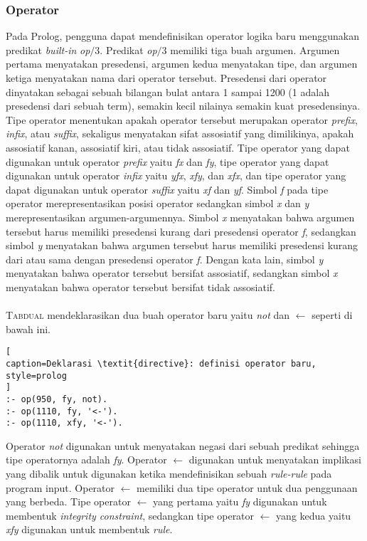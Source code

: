 \subsubsection{Operator}

Pada Prolog, pengguna dapat mendefinisikan operator logika baru menggunakan predikat \textit{built-in} \textit{op$/$}3. Predikat \textit{op$/$}3 memiliki tiga buah argumen. Argumen pertama menyatakan presedensi, argumen kedua menyatakan tipe, dan argumen ketiga menyatakan nama dari operator tersebut. Presedensi dari operator dinyatakan sebagai sebuah bilangan bulat antara 1 sampai 1200 (1 adalah presedensi dari sebuah term), semakin kecil nilainya semakin kuat presedensinya. Tipe operator menentukan apakah operator tersebut merupakan operator \textit{prefix}, \textit{infix}, atau \textit{suffix}, sekaligus menyatakan sifat assosiatif yang dimilikinya, apakah assosiatif kanan, assosiatif kiri, atau tidak assosiatif. Tipe operator yang dapat digunakan untuk operator \textit{prefix} yaitu \textit{fx} dan \textit{fy}, tipe operator yang dapat digunakan untuk operator \textit{infix} yaitu \textit{yfx}, \textit{xfy}, dan \textit{xfx}, dan tipe operator yang dapat digunakan untuk operator \textit{suffix} yaitu \textit{xf} dan \textit{yf}. Simbol \textit{f} pada tipe operator merepresentasikan posisi operator sedangkan simbol \textit{x} dan \textit{y} merepresentasikan argumen-argumennya. Simbol \textit{x} menyatakan bahwa argumen tersebut harus memiliki presedensi kurang dari presedensi operator \textit{f}, sedangkan simbol \textit{y} menyatakan bahwa argumen tersebut harus memiliki presedensi kurang dari atau sama dengan presedensi operator \textit{f}. Dengan kata lain, simbol \textit{y} menyatakan bahwa operator tersebut bersifat assosiatif, sedangkan simbol \textit{x} menyatakan bahwa operator tersebut bersifat tidak assosiatif. 
\\ \\
\textsc{Tabdual} mendeklarasikan dua buah operator baru yaitu \textit{not} dan $\leftarrow$ seperti di bawah ini.
\\

\begin{lstlisting}[
caption=Deklarasi \textit{directive}: definisi operator baru,
style=prolog
]
:- op(950, fy, not).
:- op(1110, fy, '<-').
:- op(1110, xfy, '<-').
\end{lstlisting}

Operator \textit{not} digunakan untuk menyatakan negasi dari sebuah predikat sehingga tipe operatornya adalah \textit{fy}. Operator $\leftarrow$ digunakan untuk menyatakan implikasi yang dibalik untuk digunakan ketika mendefinisikan sebuah \textit{rule-rule} pada program input. Operator $\leftarrow$ memiliki dua tipe operator untuk dua penggunaan yang berbeda. Tipe operator $\leftarrow$ yang pertama yaitu \textit{fy} digunakan untuk membentuk \textit{integrity constraint}, sedangkan tipe operator $\leftarrow$ yang kedua yaitu \textit{xfy} digunakan untuk membentuk \textit{rule}.

